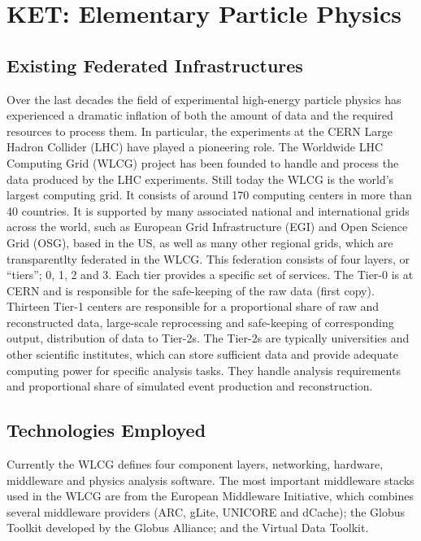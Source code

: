 \section{KET: Elementary Particle Physics}


\subsection{Existing Federated Infrastructures}
Over the last decades the field of experimental high-energy particle
physics has experienced a dramatic inflation of both the amount of
data and the required resources to process them. In particular, the
experiments at the CERN Large Hadron Collider (LHC) have played a
pioneering role. The Worldwide LHC Computing Grid (WLCG) project has
been founded to handle and process the data produced by the LHC
experiments. Still today  the WLCG is the world's largest computing
grid. It consists of around 170 computing centers in more than 40
countries.  It is supported by many associated national and
international grids across the world, such as European Grid
Infrastructure (EGI) and Open Science Grid (OSG), based in the US, as well as many other
regional grids, which are transparentlty federated in the WLCG.  
This federation consists of four layers, or ``tiers''; 0, 1, 2
and 3. Each tier provides a specific set of services. The Tier-0 is at
CERN and is responsible for the safe-keeping of the raw data (first
copy). Thirteen Tier-1 centers are responsible for a proportional
share of raw and reconstructed data, large-scale reprocessing and
safe-keeping of corresponding output, distribution of data to Tier-2s. The Tier-2s are typically universities and other scientific
institutes, which can store sufficient data and provide adequate
computing power for specific analysis tasks. They handle analysis
requirements and proportional share of simulated event production and
reconstruction.


\subsection{Technologies Employed}
Currently the WLCG defines four component layers,  networking, hardware, middleware and
physics analysis software. The most important middleware stacks used
in the WLCG are from the European Middleware Initiative, which
combines several middleware providers (ARC, gLite, UNICORE and
dCache); the Globus Toolkit developed by the Globus Alliance; and the
Virtual Data Toolkit.



